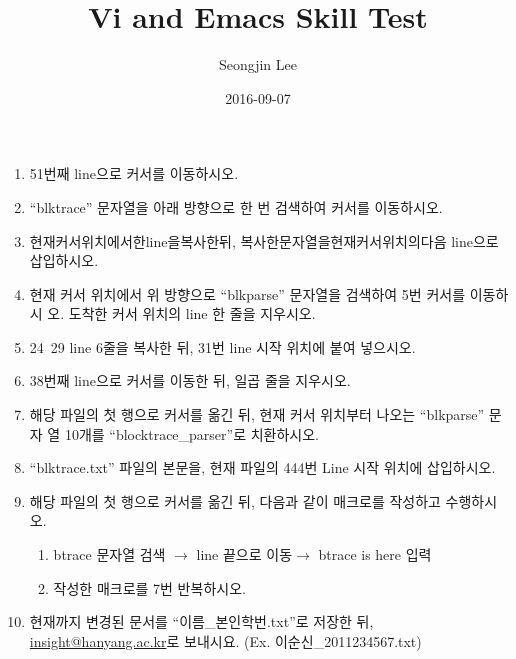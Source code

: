 \documentclass{article}
\title{Vi and Emacs Skill Test}
\author{Seongjin Lee}
\date{2016-09-07}
\begin{document}
\maketitle 

\noindent
{}

\begin{enumerate}
\item 51번째 line으로 커서를 이동하시오.
\item ``blktrace'' 문자열을 아래 방향으로 한 번 검색하여 커서를 이동하시오.
\item 현재커서위치에서한line을복사한뒤, 복사한문자열을현재커서위치의다음 line으로 삽입하시오.
\item 현재 커서 위치에서 위 방향으로 ``blkparse'' 문자열을 검색하여 5번 커서를 이동하시 오. 도착한 커서 위치의 line 한 줄을 지우시오.
\item 24~29 line 6줄을 복사한 뒤, 31번 line 시작 위치에 붙여 넣으시오.
\item 38번째 line으로 커서를 이동한 뒤, 일곱 줄을 지우시오.
\item 해당 파일의 첫 행으로 커서를 옮긴 뒤, 현재 커서 위치부터 나오는 ``blkparse'' 문자 열 10개를 ``blocktrace\_parser''로 치환하시오.
\item ``blktrace.txt'' 파일의 본문을, 현재 파일의 444번 Line 시작 위치에 삽입하시오.
\item 해당 파일의 첫 행으로 커서를 옮긴 뒤, 다음과 같이 매크로를 작성하고 수행하시오.
\begin{enumerate}
\item btrace 문자열 검색 $\rightarrow$ line 끝으로 이동$\rightarrow$ btrace is here 입력
\item 작성한 매크로를 7번 반복하시오.
\end{enumerate}
\item 현재까지 변경된 문서를 ``이름\_본인학번.txt''로 저장한 뒤, \href{mailto:insight@hanyang.ac.kr}{insight@hanyang.ac.kr}로 보내시요. (Ex. 이순신\_2011234567.txt)
\end{enumerate}
\end{document}
